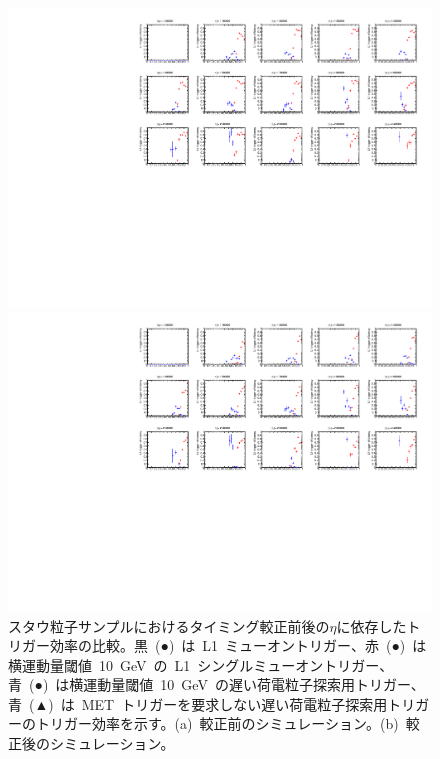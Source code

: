 \begin{figure}[H]
    \begin{minipage}{0.49\hsize}
    \centering   
    \includegraphics[width=\textwidth,page=9]{img/rec/stau_600_ori.pdf}
    \subcaption{}
    \end{minipage}
    \begin{minipage}{0.49\hsize}
    \centering   
    \includegraphics[width=\textwidth,page=9]{img/rec/stau_600.pdf}
    \subcaption{}
    \end{minipage}
    \caption[スタウ粒子サンプルにおけるタイミング較正前後の$\eta$に依存したトリガー効率の比較]{スタウ粒子サンプルにおけるタイミング較正前後の$\eta$に依存したトリガー効率の比較。黒~(●)~は~L1~ミューオントリガー、赤~(●)~は横運動量閾値~10~GeV~の~L1~シングルミューオントリガー、青~(●)~は横運動量閾値~10~GeV~の遅い荷電粒子探索用トリガー、青~(▲)~は~MET~トリガーを要求しない遅い荷電粒子探索用トリガーのトリガー効率を示す。(a)~較正前のシミュレーション。(b)~較正後のシミュレーション。}\label{fig:trieta}
\end{figure}

